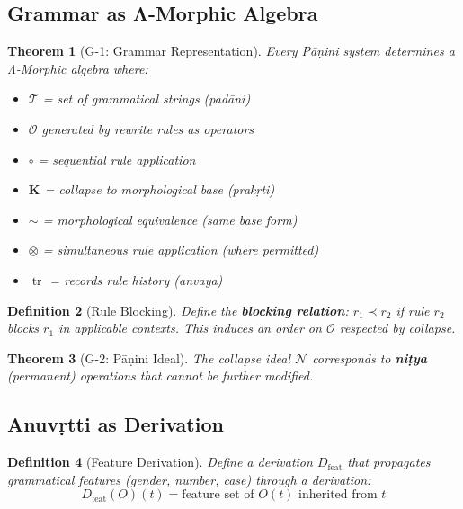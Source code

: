 \documentclass[12pt, oneside]{article}
\newtheorem{theorem}{Theorem}[section]
\newtheorem{definition}[theorem]{Definition}
\DeclareMathOperator{\tr}{tr}
\newcommand{\K}{\mathbf{K}}
\newcommand{\N}{\mathcal{N}}
\newcommand{\T}{\mathcal{T}}
\newcommand{\Opr}{\mathcal{O}}
\begin{document}
\subsection{Grammar as Λ-Morphic Algebra}

\begin{theorem}[G-1: Grammar Representation]
Every Pāṇini system determines a Λ-Morphic algebra where:
\begin{itemize}
    \item $\T$ = set of grammatical strings (padāni)
    \item $\Opr$ generated by rewrite rules as operators
    \item $\circ$ = sequential rule application
    \item $\K$ = collapse to morphological base (prakṛti)
    \item $\sim$ = morphological equivalence (same base form)
    \item $\otimes$ = simultaneous rule application (where permitted)
    \item $\tr$ = records rule history (anvaya)
\end{itemize}
\end{theorem}

\begin{definition}[Rule Blocking]
Define the \textbf{blocking relation}: $r_1 \prec r_2$ if rule $r_2$ blocks $r_1$ in applicable contexts. This induces an order on $\Opr$ respected by collapse.
\end{definition}

\begin{theorem}[G-2: Pāṇini Ideal]
The collapse ideal $\N$ corresponds to \textbf{niṭya} (permanent) operations that cannot be further modified.
\end{theorem}

\subsection{Anuvṛtti as Derivation}

\begin{definition}[Feature Derivation]
Define a derivation $D_{\text{feat}}$ that propagates grammatical features (gender, number, case) through a derivation:
\begin{equation}
D_{\text{feat}}(O)(t) = \text{feature set of } O(t) \text{ inherited from } t
\end{equation}
\end{definition}
\end{document}
